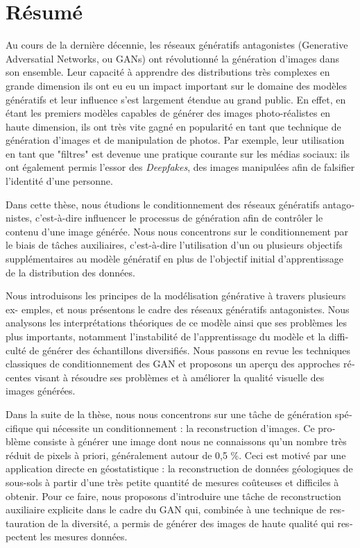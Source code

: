 \chapter*{Résumé}
\label{chap:resume}

\begin{otherlanguage}{french}
Au cours de la dernière décennie, les réseaux génératifs antagonistes (Generative Adversatial Networks, ou \ac{GAN}s) ont révolutionné la génération d'images dans son ensemble. Leur capacité à apprendre des distributions très complexes en grande dimension ils ont eu eu un impact important sur le domaine des modèles génératifs et leur influence s'est largement étendue au grand public. En effet, en étant les premiers modèles capables de générer des images photo-réalistes en haute dimension, ils ont très vite gagné en popularité en tant que technique de génération d'images et de manipulation de photos. Par exemple, leur utilisation en tant que "filtres" est devenue une pratique courante sur les médias sociaux: ils ont également permis l'essor des \textit{Deepfakes}, des images manipulées afin de falsifier l'identité d'une personne. 

Dans cette thèse, nous étudions le conditionnement des réseaux génératifs antagonistes, c'est-à-dire influencer le processus de génération afin de contrôler le contenu d'une image générée. Nous nous concentrons sur le conditionnement par le biais de tâches auxiliaires, c'est-à-dire l'utilisation d'un ou plusieurs objectifs supplémentaires au modèle génératif en plus de l'objectif initial d'apprentissage de la distribution des données.

Nous introduisons les principes de la modélisation générative à travers plusieurs ex- emples, et nous présentons le cadre des réseaux génératifs antagonistes. Nous analysons les interprétations théoriques de ce modèle ainsi que ses problèmes les plus importants, notamment l'instabilité de l'apprentissage du modèle et la difficulté de générer des échantillons diversifiés. Nous passons en revue les techniques classiques de conditionnement des GAN et proposons un aperçu des approches récentes visant à résoudre ses problèmes et à améliorer la qualité visuelle des images générées.

Dans la suite de la thèse, nous nous concentrons sur une tâche de génération spécifique qui nécessite un conditionnement : la reconstruction d'images. Ce problème consiste à générer une image dont nous ne connaissons qu'un nombre très réduit de pixels à priori, généralement autour de 0,5 \%. Ceci est motivé par une application directe en géostatistique : la reconstruction de données géologiques de sous-sols à partir d'une très petite quantité de mesures coûteuses et difficiles à obtenir. Pour ce faire, nous proposons d'introduire une tâche de reconstruction auxiliaire explicite dans le cadre du GAN qui, combinée à une technique de restauration de la diversité, a permis de générer des images de haute qualité qui respectent les mesures données.


\end{otherlanguage}

